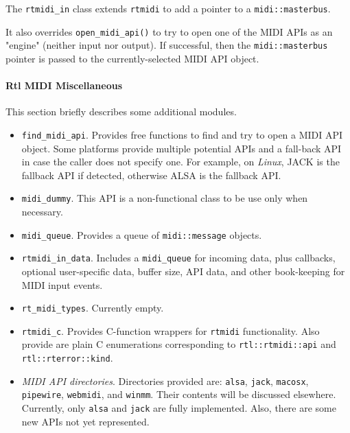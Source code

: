    The \texttt{rtmidi\_in} class extends \texttt{rtmidi} to
   add a pointer to a \texttt{midi::masterbus}.

   It also overrides \texttt{open\_midi\_api()} to try to open
   one of the MIDI APIs as an "engine" (neither input nor output).
   If successful, then the \texttt{midi::masterbus} pointer is
   passed to the currently-selected MIDI API object.

\paragraph{Rtl MIDI Miscellaneous}
\label{paragraph:rtl_midi_miscellaneous}

   This section briefly describes some additional modules.

   \begin{itemize}
      \item \texttt{find\_midi\_api}.
         Provides free functions to find and try to open a MIDI API object.
         Some platforms provide multiple potential APIs and a fall-back
         API in case the caller does not specify one. For example,
         on \textsl{Linux}, JACK is the fallback API if detected, otherwise
         ALSA is the fallback API.
      \item \texttt{midi\_dummy}.
         This API is a non-functional class to be use only when necessary.
      \item \texttt{midi\_queue}.
         Provides a queue of \texttt{midi::message} objects.
      \item \texttt{rtmidi\_in\_data}.
         Includes a \texttt{midi\_queue} for incoming data, plus
         callbacks, optional user-specific data, buffer size, API data, and
         other book-keeping for MIDI input events.
      \item \texttt{rt\_midi\_types}.
         Currently empty.
      \item \texttt{rtmidi\_c}.
         Provides C-function wrappers for \texttt{rtmidi} functionality.
         Also provide are plain C enumerations corresponding to
         \texttt{rtl::rtmidi::api} and
         \texttt{rtl::rterror::kind}.
      \item \textsl{MIDI API directories}.
         Directories provided are:
         \texttt{alsa},
         \texttt{jack},
         \texttt{macosx},
         \texttt{pipewire},
         \texttt{webmidi}, and
         \texttt{winmm}.
         Their contents will be discussed elsewhere.
         Currently, only \texttt{alsa} and \texttt{jack} are fully implemented.
         Also, there are some new APIs not yet represented.
   \end{itemize}

